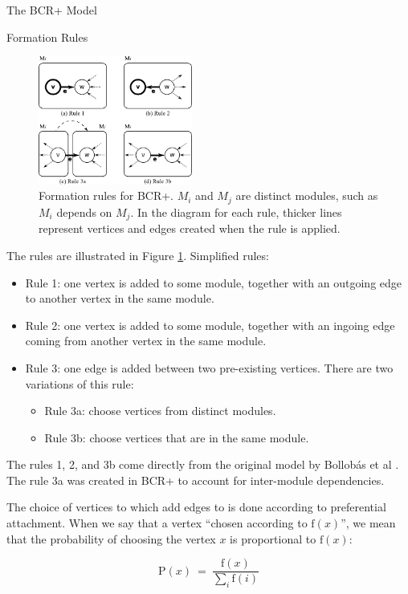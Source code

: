 \documentclass[11pt,twocolumn,a4paper,english]{article}
\begin{document}
\begin{section}{The BCR+ Model}
\begin{subsection}{Formation Rules}
\begin{figure}[htbp]
	\centering
		\includegraphics[width=0.45\textwidth]{figures/bcr-rules}
	\caption{Formation rules for BCR+. $M_i$ and $M_j$ are distinct modules, such as $M_i$ depends on $M_j$. In the diagram for each rule, thicker lines represent vertices and edges created when the rule is applied.}
	\label{fig:bcr-rules}
\end{figure}

	The rules are illustrated in Figure \ref{fig:bcr-rules}. Simplified rules:
	
	\begin{itemize}
		\item Rule 1: one vertex is added to some module, together with an outgoing edge to another vertex in the same module.
		\item Rule 2: one vertex is added to some module, together with an ingoing edge coming from another vertex in the same module.
		\item Rule 3: one edge is added between two pre-existing vertices. There are two variations of this rule:
		\begin{itemize}
			\item Rule 3a: choose vertices from distinct modules.
			\item Rule 3b: choose vertices that are in the same module.
		\end{itemize}
	\end{itemize}
	
	The rules 1, 2, and 3b come directly from the original model by Bollobás et al \cite{Bollobas2003}. The rule 3a was created in BCR+ to account for inter-module dependencies.
	
	The choice of vertices to which add edges to is done according to preferential attachment. When we say that a vertex ``chosen according to $\mathrm{f}(x)$'', we mean that the probability of choosing the vertex $x$ is proportional to $\mathrm{f}(x)$:
	
	$$
	  \mathrm{P}(x) ~=~ \frac{ \mathrm{f}(x) }
	  { \displaystyle\sum_{i} \mathrm{f}(i) }
	$$
	

\end{subsection}
\end{section}
\end{document}
